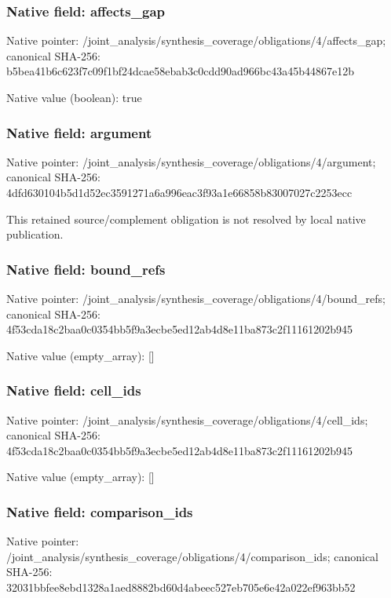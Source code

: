 \documentclass[10pt,a4paper]{article}
\begin{document}
\subsubsection{Native field: affects\_\allowbreak{}gap}
Native pointer: /joint\_\allowbreak{}analysis/synthesis\_\allowbreak{}coverage/obligations/4/affects\_\allowbreak{}gap; canonical SHA-256: b5bea41b6c623f7c09f1bf24dcae58ebab3c0cdd90ad966bc43a45b44867e12b

Native value (boolean): true

\subsubsection{Native field: argument}
Native pointer: /joint\_\allowbreak{}analysis/synthesis\_\allowbreak{}coverage/obligations/4/argument; canonical SHA-256: 4dfd630104b5d1d52ec3591271a6a996eac3f93a1e66858b83007027c2253ecc

\begingroup\raggedright\sloppy This retained source/\allowbreak{}complement obligation is not resolved by local native publication.\par\endgroup

\subsubsection{Native field: bound\_\allowbreak{}refs}
Native pointer: /joint\_\allowbreak{}analysis/synthesis\_\allowbreak{}coverage/obligations/4/bound\_\allowbreak{}refs; canonical SHA-256: 4f53cda18c2baa0c0354bb5f9a3ecbe5ed12ab4d8e11ba873c2f11161202b945

Native value (empty\_\allowbreak{}array): []

\subsubsection{Native field: cell\_\allowbreak{}ids}
Native pointer: /joint\_\allowbreak{}analysis/synthesis\_\allowbreak{}coverage/obligations/4/cell\_\allowbreak{}ids; canonical SHA-256: 4f53cda18c2baa0c0354bb5f9a3ecbe5ed12ab4d8e11ba873c2f11161202b945

Native value (empty\_\allowbreak{}array): []

\subsubsection{Native field: comparison\_\allowbreak{}ids}
Native pointer: /joint\_\allowbreak{}analysis/synthesis\_\allowbreak{}coverage/obligations/4/comparison\_\allowbreak{}ids; canonical SHA-256: 32031bbfee8ebd1328a1aed8882bd60d4abeec527eb705e6e42a022ef963bb52
\end{document}
